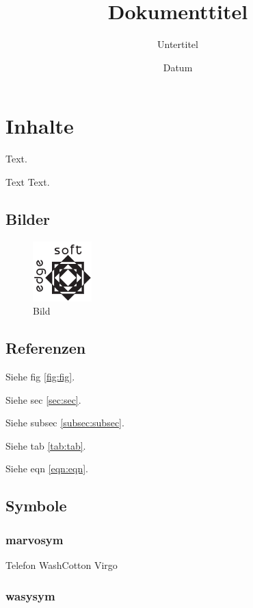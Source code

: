 \documentclass[ngerman]{scrartcl}
\title[Kurzform]{Dokumenttitel}
\subtitle{Untertitel}
\date{Datum}
\begin{document}
	\maketitle

	\tableofcontents
	\cleardoublepage

	\section{Inhalte}
	\label{sec:sec}

	Text.

	Text  Text.

	\subsection{Bilder}
	\label{subsec:subsec}

	\begin{figure}[htb]
		\caption{Bild}
		\label{fig:fig}
		\includegraphics{testlogo}
	\end{figure}

	\subsection{Referenzen}

	Siehe fig \autoref{fig:fig}.

	Siehe sec \autoref{sec:sec}.

	Siehe subsec \autoref{subsec:subsec}.

	Siehe tab \autoref{tab:tab}.

	Siehe eqn \autoref{eqn:eqn}.

	\subsection{Symbole}

	\subsubsection{marvosym}

	Telefon \Telefon{}
	WashCotton \WashCotton{}
	Virgo \Virgo{}

	\subsubsection{wasysym}
\end{document}
